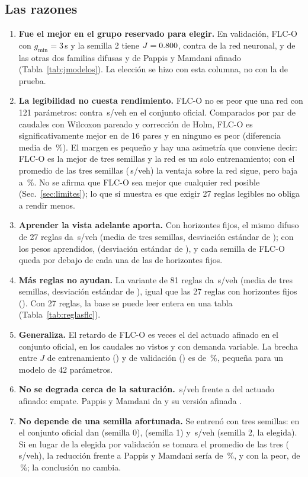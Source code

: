 \documentclass[11pt,a4paper]{article}
\newcommand{\FLC}{FLC-O}
\begin{document}
\subsection{Las razones}
\begin{enumerate}
\item \textbf{Fue el mejor en el grupo reservado para elegir.} En validación, \FLC{} con $g_{\min}=3$\,s y la semilla 2 tiene $J=0.800$, contra \JValMlp{} de la red neuronal, \JValFlcsFijos{} y \JValFlcsGap{} de las otras dos familias difusas y \JValPapAf{} de Pappis y Mamdani afinado (Tabla~\ref{tab:jmodelos}). La elección se hizo con esta columna, no con la de prueba.
\item \textbf{La legibilidad no cuesta rendimiento.} \FLC{} no es peor que una red con 121 parámetros: \DelayOfFlc{} contra \DelayOfMlp{}\,s/veh en el conjunto oficial. Comparados por par de caudales con Wilcoxon pareado y corrección de Holm, \FLC{} es significativamente mejor en \JFlcMlpMejor{} de 16 pares y en ninguno es peor (diferencia media de \JFlcMlpMedia\,\%). El margen es pequeño y hay una asimetría que conviene decir: \FLC{} es la mejor de tres semillas y la red es un solo entrenamiento; con el promedio de las tres semillas (\JSemMedia{}\,s/veh) la ventaja sobre la red sigue, pero baja a \JRedMlpSem\,\%. No se afirma que \FLC{} sea mejor que cualquier red posible (Sec.~\ref{sec:limites}); lo que sí muestra es que exigir 27 reglas legibles no obliga a rendir menos.
\item \textbf{Aprender la vista adelante aporta.} Con horizontes fijos, el mismo difuso de 27 reglas da \MedOfFijos{}\,s/veh (media de tres semillas, desviación estándar de \SdOfFijos{}); con los pesos aprendidos, \MedOfGTres{} (desviación estándar de \SdOfGTres{}), y cada semilla de \FLC{} queda por debajo de cada una de las de horizontes fijos.
\item \textbf{Más reglas no ayudan.} La variante de 81 reglas da \MedOfReglas{}\,s/veh (media de tres semillas, desviación estándar de \SdOfReglas{}), igual que las 27 reglas con horizontes fijos (\MedOfFijos{}). Con 27 reglas, la base se puede leer entera en una tabla (Tabla~\ref{tab:reglasflc}).
\item \textbf{Generaliza.} El retardo de \FLC{} es \JRazOf{} veces el del actuado afinado en el conjunto oficial, \JRazNv{} en los caudales no vistos y \JRazVa{} con demanda variable. La brecha entre $J$ de entrenamiento (\JTrFlc) y de validación (\JValFlc) es de \JBrecha\,\%, pequeña para un modelo de 42 parámetros.
\item \textbf{No se degrada cerca de la saturación.} \DelaySaFlc{}\,s/veh frente a \DelaySaActAf{} del actuado afinado: empate. Pappis y Mamdani da \DelaySaPap{} y su versión afinada \DelaySaPapAf{}.
\item \textbf{No depende de una semilla afortunada.} Se entrenó con tres semillas: en el conjunto oficial dan \JSemCero{} (semilla 0), \JSemUno{} (semilla 1) y \DelayOfFlc{}\,s/veh (semilla 2, la elegida). Si en lugar de la elegida por validación se tomara el promedio de las tres (\JSemMedia{}\,s/veh), la reducción frente a Pappis y Mamdani sería de \JRedSemMedia\,\%, y con la peor, de \JRedSemPeor\,\%; la conclusión no cambia.
\end{enumerate}
\end{document}
